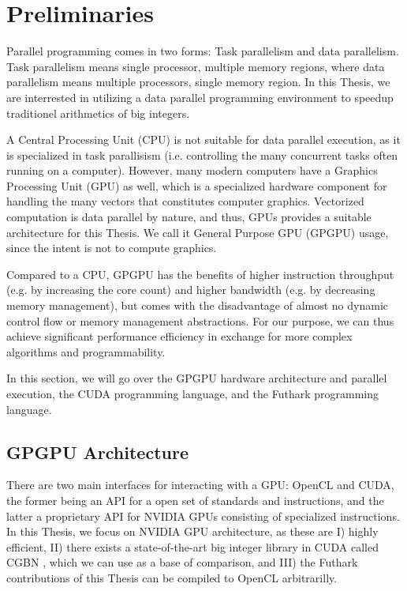\section{Preliminaries}
\label{sec:pre}
Parallel programming comes in two forms: Task parallelism and data
parallelism. Task parallelism means single processor, multiple memory regions,
where data parallelism means multiple processors, single memory region. In this
Thesis, we are interrested in utilizing a data parallel programming environment
to speedup traditionel arithmetics of big integers.

A Central Processing Unit (CPU) is not suitable for data parallel execution, as
it is specialized in task parallisism (i.e. controlling the many concurrent
tasks often running on a computer). However, many modern computers have a
Graphics Processing Unit (GPU) as well, which is a specialized hardware
component for handling the many vectors that constitutes computer graphics.
Vectorized computation is data parallel by nature, and thus, GPUs provides a
suitable architecture for this Thesis. We call it General Purpose GPU (GPGPU)
usage, since the intent is not to compute graphics.

Compared to a CPU, GPGPU has the benefits of higher instruction throughput
(e.g. by increasing the core count) and higher bandwidth (e.g. by decreasing
memory management), but comes with the disadvantage of almost no dynamic control
flow or memory management abstractions. For our purpose, we can thus achieve
significant performance efficiency in exchange for more complex algorithms and
programmability.

In this section, we will go over the GPGPU hardware architecture and parallel
execution, the CUDA programming language, and the Futhark programming language.

\subsection{GPGPU Architecture}
\label{subsec:gpgpu}

There are two main interfaces for interacting with a GPU: OpenCL and CUDA, the
former being an API for a open set of standards and instructions, and the latter
a proprietary API for NVIDIA GPUs consisting of specialized instructions. In
this Thesis, we focus on NVIDIA GPU architecture, as these are I) highly
efficient, II) there exists a state-of-the-art big integer library in CUDA
called CGBN \cite{CGBN}, which we can use as a base of comparison, and III) the
Futhark contributions of this Thesis can be compiled to OpenCL arbitrarilly.


